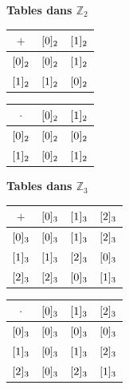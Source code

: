 \begin{enumerate}[label=\thechapter.\arabic*, font=\bfseries, itemsep=7mm,labelsep*=3mm,left=0mm]
\begin{enumerate}[label=\alph*),itemsep=5mm,left=-1mm,labelsep*=2mm]
\noindent
\begin{minipage}[t]{0.48\linewidth}
	\vspace{0pt}\centering
	\textbf{Tables dans $\mathbb{Z}_2$} \\ \vspace{0.2cm}
	\renewcommand{\arraystretch}{1.1}
	\setlength{\tabcolsep}{3pt}
	\begin{tabular}{c|cc}
		$+$ & $\cl[2]{0}$ & $\cl[2]{1}$ \\ \hline
		$\cl[2]{0}$ & $\cl[2]{0}$ & $\cl[2]{1}$ \\
		$\cl[2]{1}$ & $\cl[2]{1}$ & $\cl[2]{0}$
	\end{tabular}
	\quad
	\begin{tabular}{c|cc}
		$\cdot$ & $\cl[2]{0}$ & $\cl[2]{1}$ \\ \hline
		$\cl[2]{0}$ & $\cl[2]{0}$ & $\cl[2]{0}$ \\
		$\cl[2]{1}$ & $\cl[2]{0}$ & $\cl[2]{1}$
	\end{tabular}
\end{minipage}%
\hfill
\begin{minipage}[t]{0.48\linewidth}
	\vspace{0pt}\centering
	\textbf{Tables dans $\mathbb{Z}_3$} \\ \vspace{0.2cm}
	\renewcommand{\arraystretch}{1.1}
	\setlength{\tabcolsep}{3pt}
	\begin{tabular}{c|ccc}
		$+$ & $\cl[3]{0}$ & $\cl[3]{1}$ & $\cl[3]{2}$ \\ \hline
		$\cl[3]{0}$ & $\cl[3]{0}$ & $\cl[3]{1}$ & $\cl[3]{2}$ \\
		$\cl[3]{1}$ & $\cl[3]{1}$ & $\cl[3]{2}$ & $\cl[3]{0}$ \\
		$\cl[3]{2}$ & $\cl[3]{2}$ & $\cl[3]{0}$ & $\cl[3]{1}$
	\end{tabular}
	\quad
	\begin{tabular}{c|ccc}
		$\cdot$ & $\cl[3]{0}$ & $\cl[3]{1}$ & $\cl[3]{2}$ \\ \hline
		$\cl[3]{0}$ & $\cl[3]{0}$ & $\cl[3]{0}$ & $\cl[3]{0}$ \\
		$\cl[3]{1}$ & $\cl[3]{0}$ & $\cl[3]{1}$ & $\cl[3]{2}$ \\
		$\cl[3]{2}$ & $\cl[3]{0}$ & $\cl[3]{2}$ & $\cl[3]{1}$
	\end{tabular}
\end{minipage}

\vspace{0.4cm}


\end{enumerate}
\end{enumerate}
